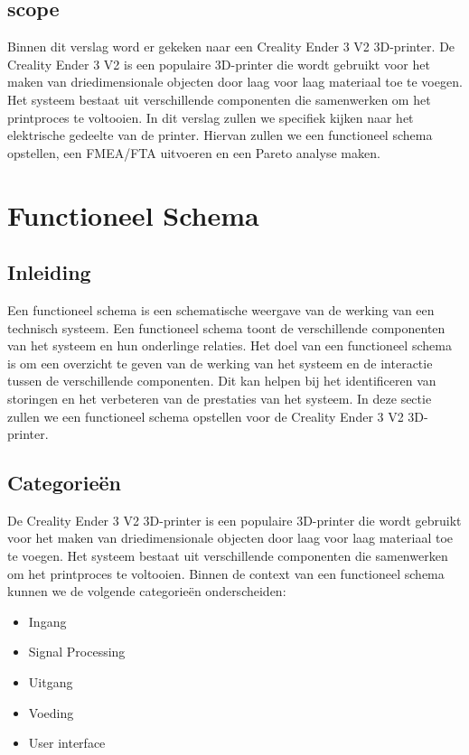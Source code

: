 \documentclass{article}
\begin{document}
\subsection{scope}
Binnen dit verslag word er gekeken naar een Creality Ender 3 V2 3D-printer. De Creality Ender 3 V2 is een populaire 3D-printer die wordt gebruikt voor het maken van driedimensionale objecten door laag voor laag materiaal toe te voegen. Het systeem bestaat uit verschillende componenten die samenwerken om het printproces te voltooien. In dit verslag zullen we specifiek kijken naar het elektrische gedeelte van de printer. Hiervan zullen we een functioneel schema opstellen, een FMEA/FTA uitvoeren en een Pareto analyse maken.

\newpage

\section{Functioneel Schema}
\subsection{Inleiding}
Een functioneel schema is een schematische weergave van de werking van een technisch systeem. Een functioneel schema toont de verschillende componenten van het systeem en hun onderlinge relaties. Het doel van een functioneel schema is om een overzicht te geven van de werking van het systeem en de interactie tussen de verschillende componenten. Dit kan helpen bij het identificeren van storingen en het verbeteren van de prestaties van het systeem. In deze sectie zullen we een functioneel schema opstellen voor de Creality Ender 3 V2 3D-printer.

\subsection{Categorieën}
De Creality Ender 3 V2 3D-printer is een populaire 3D-printer die wordt gebruikt voor het maken van driedimensionale objecten door laag voor laag materiaal toe te voegen. Het systeem bestaat uit verschillende componenten die samenwerken om het printproces te voltooien. Binnen de context van een functioneel schema kunnen we de volgende categorieën onderscheiden:
\begin{itemize}
  \item Ingang
  \item Signal Processing
  \item Uitgang
  \item Voeding
  \item User interface
\end{itemize}
\end{document}
